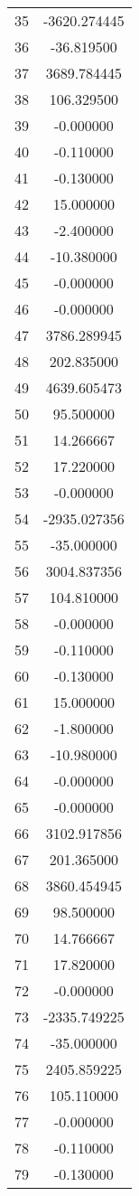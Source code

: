 \documentclass[12pt]{article}
\begin{document}
\begin{longtable}{@{}cc@{}}
35 & -3620.274445 \\
36 & -36.819500 \\
37 & 3689.784445 \\
38 & 106.329500 \\
39 & -0.000000 \\
40 & -0.110000 \\
41 & -0.130000 \\
42 & 15.000000 \\
43 & -2.400000 \\
44 & -10.380000 \\
45 & -0.000000 \\
46 & -0.000000 \\
47 & 3786.289945 \\
48 & 202.835000 \\
49 & 4639.605473 \\
50 & 95.500000 \\
51 & 14.266667 \\
52 & 17.220000 \\
53 & -0.000000 \\
54 & -2935.027356 \\
55 & -35.000000 \\
56 & 3004.837356 \\
57 & 104.810000 \\
58 & -0.000000 \\
59 & -0.110000 \\
60 & -0.130000 \\
61 & 15.000000 \\
62 & -1.800000 \\
63 & -10.980000 \\
64 & -0.000000 \\
65 & -0.000000 \\
66 & 3102.917856 \\
67 & 201.365000 \\
68 & 3860.454945 \\
69 & 98.500000 \\
70 & 14.766667 \\
71 & 17.820000 \\
72 & -0.000000 \\
73 & -2335.749225 \\
74 & -35.000000 \\
75 & 2405.859225 \\
76 & 105.110000 \\
77 & -0.000000 \\
78 & -0.110000 \\
79 & -0.130000 \\

\end{longtable}
\end{document}
